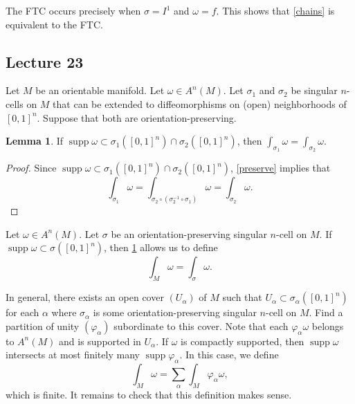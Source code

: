 \documentclass[10pt,letterpaper,cm]{nupset}
\theoremstyle{definition}
\theoremstyle{theorem}
\newtheorem{lemma}[definition]{Lemma}
\theoremstyle{remark}
\newcommand{\1}{\mathbf{1}}
\newcommand{\0}{\vec 0}
\DeclareMathOperator{\supp}{supp}
\begin{document}
\smallskip

The FTC occurs precisely when $\sigma = I^1$ and $\omega = f$. This shows that \cref{chains} is equivalent to the FTC.



\subsection{Lecture 23}

Let $M$ be an orientable manifold. Let $\omega \in A^n(M)$. Let $\sigma_1$ and $\sigma_2$ be singular $n$-cells on $M$ that can be extended to diffeomorphisms on (open) neighborhoods of $\left[0,1\right]^n$. Suppose that both are orientation-preserving. 

\begin{lemma}\label{orient}
If $\supp \omega \subset  \sigma_1(\left[0,1\right]^n) \cap \sigma_2(\left[0,1\right]^n)$, then $\int_{\sigma_1} \omega = \int_{\sigma_2} \omega$.
\end{lemma}
\begin{proof}
Since $\supp \omega \subset  \sigma_1(\left[0,1\right]^n) \cap \sigma_2(\left[0,1\right]^n)$, \cref{preserve} implies that 
\[
\int_{\sigma_1} \omega = \int_{\sigma_2 \circ (\sigma_2^{-1} \circ \sigma_1)} \omega  = \int_{\sigma_2} \omega     .
\]
\end{proof}

\medskip

 Let $\omega \in A^n(M)$. Let $\sigma$ be an orientation-preserving singular $n$-cell on $M$. If $\supp \omega \subset \sigma(\left[0,1\right]^n)$, then \cref{orient} allows us to define $$\int_M \omega = \int_{\sigma} \omega.$$

\smallskip


 In general, there exists an open cover $(U_{\alpha})$ of $M$ such that $U_{\alpha} \subset \sigma_{\alpha}(\left[0,1\right]^n)$ for each $\alpha$ where $\sigma_{\alpha}$ is some orientation-preserving singular $n$-cell on $M$. Find a partition of unity $(\varphi_{\alpha})$ subordinate to this cover. Note that each $\varphi_{\alpha} \omega$ belongs to  $A^n(M)$ and is supported in $U_{\alpha}$. If $\omega$ is compactly supported, then $\supp \omega$ intersects at most finitely many $\supp \varphi_{\alpha}$. In this case, we define $$\int_M \omega = \sum_{\alpha}  \int_M \varphi_{\alpha} \omega,$$ which is finite. 
It remains to check that this definition makes sense.
\end{document}
